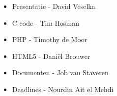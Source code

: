 \begin{itemize}

\item
Presentatie - David Veselka

\item
C-code - Tim Hosman

\item
PHP - Timothy de Moor

\item
HTML5 - Dani\"el Brouwer

\item
Documenten - Job van Staveren

\item
Deadlines - Nourdin Ait el Mehdi

\end{itemize}



